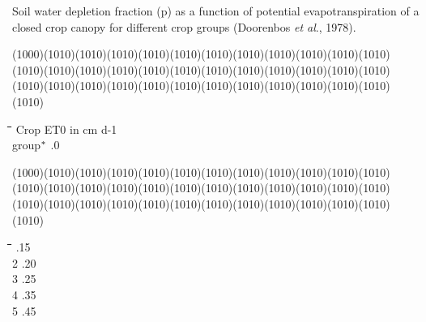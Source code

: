 \documentclass[11pt]{article}
\begin{document}
\begin{indenting}{2.54cm}
Soil water depletion fraction (p) as a function of potential evapotranspira\-tion of a closed crop canopy for different crop groups (Doorenbos {\it et al\/}.,
1978).
\end{indenting}
\GrBox(1000)\GrBox(1010)\GrBox(1010)\GrBox(1010)\GrBox(1010)\GrBox(1010)\GrBox(1010)\GrBox(1010)\GrBox(1010)\GrBox(1010)\GrBox(1010)\GrBox(1010)\GrBox(1010)\GrBox(1010)\GrBox(1010)\GrBox(1010)\GrBox(1010)\GrBox(1010)\GrBox(1010)\GrBox(1010)\GrBox(1010)\GrBox(1010)\GrBox(1010)\GrBox(1010)\GrBox(1010)\GrBox(1010)\GrBox(1010)\GrBox(1010)\GrBox(1010)\GrBox(1010)\GrBox(1010)\GrBox(1010)\GrBox(1010)\GrBox(1010)\GrBox(1010)\GrBox(1010)\GrBox(1010)\-\nwln
\begin{tabbing}
\hspace{1.27cm}\=\hspace{1.27cm}\=\hspace{1.27cm}\=\hspace{1.27cm}\=%
\hspace{1.27cm}\=\hspace{1.27cm}\=\hspace{1.27cm}\=\hspace{1.27cm}\=%
\hspace{1.27cm}\=\hspace{1.27cm}\=\kill
Crop\> \> \> ET0 in cm d-1\\
group$^{{\rm *}}$\> \> .0
\end{tabbing}
\GrBox(1000)\GrBox(1010)\GrBox(1010)\GrBox(1010)\GrBox(1010)\GrBox(1010)\GrBox(1010)\GrBox(1010)\GrBox(1010)\GrBox(1010)\GrBox(1010)\GrBox(1010)\GrBox(1010)\GrBox(1010)\GrBox(1010)\GrBox(1010)\GrBox(1010)\GrBox(1010)\GrBox(1010)\GrBox(1010)\GrBox(1010)\GrBox(1010)\GrBox(1010)\GrBox(1010)\GrBox(1010)\GrBox(1010)\GrBox(1010)\GrBox(1010)\GrBox(1010)\GrBox(1010)\GrBox(1010)\GrBox(1010)\GrBox(1010)\GrBox(1010)\GrBox(1010)\GrBox(1010)\GrBox(1010)\-\nwln
\begin{tabbing}
\hspace{1.27cm}\=\hspace{1.27cm}\=\hspace{1.27cm}\=\hspace{1.27cm}\=%
\hspace{1.27cm}\=\hspace{1.27cm}\=\hspace{1.27cm}\=\hspace{1.27cm}\=%
\hspace{1.27cm}\=\hspace{1.27cm}\=\> \> .15\\
2\> \> .20\\
3\> \> .25\\
4\> \> .35\\
5\> \> .45
\end{tabbing}
\end{document}
